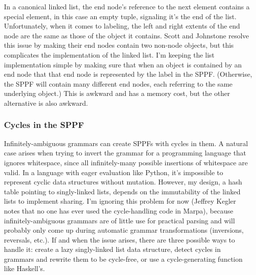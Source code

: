 \documentclass[12pt]{article}
\begin{document}
In a canonical linked list, the end node's reference to the next
element contains a special element, in this case an empty tuple,
signaling it's the end of the list.  Unfortunately, when it comes to
labeling, the left and right extents of the end node are the same as
those of the object it contains.  Scott and Johnstone resolve this
issue by making their end nodes contain two non-node objects, but this
complicates the implementation of the linked list.  I'm keeping the
list implementation simple by making sure that when an object is
contained by an end node that that end node is represented by the
label in the SPPF.  (Otherwise, the SPPF will contain many different
end nodes, each referring to the same underlying object.)   This is
awkward and has a memory cost, but the other alternative is also awkward.

\subsubsection{Cycles in the SPPF}
\label{sec:sppf_cycles}

Infinitely-ambiguous grammars can create SPPFs with cycles in them.  A
natural case arises when trying to invert the grammar for a
programming language that ignores whitespace, since all
infinitely-many possible insertions of whitespace are valid.  In a
language with eager evaluation like Python, it's impossible to
represent cyclic data structures without mutation.  However, my
design, a hash table pointing to singly-linked lists, depends on the
immutability of the linked lists to implement sharing.  I'm ignoring
this problem for now (Jeffrey Kegler notes that no one has ever used
the cycle-handling code in Marpa), because infinitely-ambiguous
grammars are of little use for practical parsing and will probably
only come up during automatic grammar transformations (inversions,
reversals, etc.).  If and when the issue arises, there are three
possible ways to handle it: create a lazy singly-linked list data
structure, detect cycles in grammars and rewrite them to be
cycle-free, or use a cycle-generating function like Haskell's.
\end{document}
